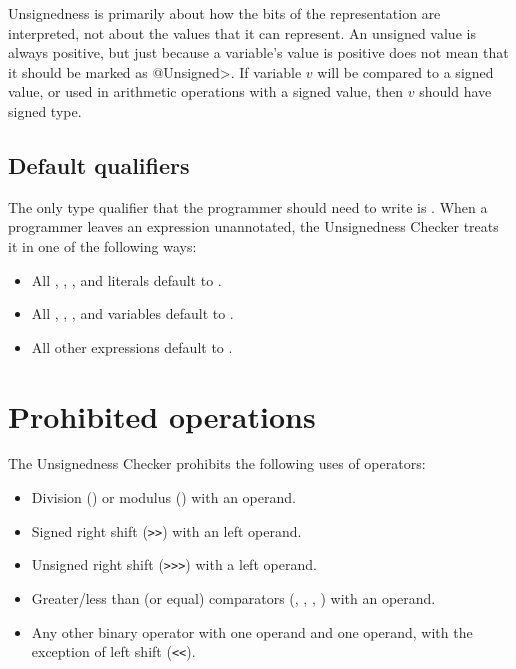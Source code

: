 Unsignedness is primarily about how the bits of the representation are
interpreted, not about the values that it can represent.  An unsigned value
is always positive, but just because a variable's value is positive does
not mean that it should be marked as \<@Unsigned>.  If variable $v$ will be
compared to a signed value, or used in arithmetic operations with a signed
value, then $v$ should have signed type.


\subsection{Default qualifiers\label{unsignedness-checker-annotations-default-qualifiers}}

The only type qualifier that the programmer should need to write is
.
When a programmer leaves an expression unannotated, the
Unsignedness Checker treats it in one of the following ways:

\begin{itemize}

    \item
    All , , , and  literals default
    to .
    \item
    All , , , and  variables default
    to .
    \item
    All other expressions default to .

\end{itemize}


\section{Prohibited operations\label{unsignedness-checker-prohibited-operations}}

The Unsignedness Checker prohibits the following uses of operators:

\begin{itemize}

    \item
    Division (\code{/}) or modulus (\code{\%}) with an 
    operand.
    \item
    Signed right shift (\verb|>>|) with an  left operand.
    \item
    Unsigned right shift (\verb|>>>|) with a  left operand.
    \item
    Greater/less than (or equal) comparators
    (\code{<}, \code{<=}, \code{>}, \code{>=}) with an 
    operand.
    \item
    Any other binary operator with one  operand and one
     operand, with the exception of left shift (\verb|<<|).

\end{itemize}

